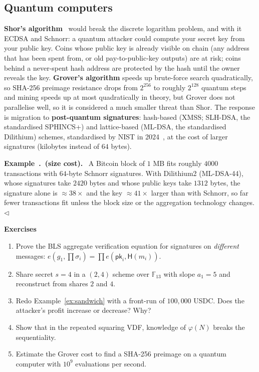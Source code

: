 \documentclass[11pt,a4paper]{article}
\newcounter{exn}[section]
\renewcommand{\theexn}{\thesection.\arabic{exn}}
\newenvironment{plainenglish}{\par\smallskip}{\par\smallskip}
\newenvironment{exbox}[1][]{\par\medskip\refstepcounter{exn}\noindent\textbf{Example~\theexn\if\relax\detokenize{#1}\relax\else\ (#1)\fi.}\ \ignorespaces}{\hfill$\triangleleft$\par\medskip}
\newenvironment{exercisebox}{\par\medskip\noindent\textbf{Exercises}\par\nopagebreak\smallskip}{\par\medskip}
\theoremstyle{definition}
\theoremstyle{plain}
\theoremstyle{remark}
\newcommand{\Hash}{\mathsf{H}}
\newcommand{\F}{\mathbb{F}}
\newcommand{\pk}{\mathsf{pk}}
\begin{document}
\subsection{Quantum computers}

\begin{plainenglish}
\textbf{Shor's algorithm}~\cite{Sho94} would break the discrete logarithm problem, and with it ECDSA and Schnorr: a quantum attacker could compute your secret key from your public key. Coins whose public key is already visible on chain (any address that has been spent from, or old pay-to-public-key outputs) are at risk;
coins behind a never-spent hash address are protected by the hash until the owner reveals the key. \textbf{Grover's algorithm} speeds up brute-force search quadratically, so SHA-256 preimage resistance drops from $2^{256}$ to roughly $2^{128}$ quantum steps and mining speeds up at most quadratically in theory, but Grover does not parallelise well,
so it is considered a much smaller threat than Shor. The response is migration to \textbf{post-quantum signatures}: hash-based (XMSS; SLH-DSA, the standardised SPHINCS+) and lattice-based (ML-DSA, the standardised Dilithium) schemes, standardised by NIST in 2024~\cite{NIST24}, at the cost of larger signatures (kilobytes instead of $64$ bytes).
\end{plainenglish}

\begin{exbox}[size cost]
A Bitcoin block of $1$ MB fits roughly $4000$ transactions with $64$-byte Schnorr signatures. With Dilithium2 (ML-DSA-44), whose signatures take $2420$ bytes and whose public keys take $1312$ bytes, the signature alone is $\approx38\times$ and the key $\approx41\times$ larger than with Schnorr, so far fewer transactions fit unless the block size or the aggregation technology changes.
\end{exbox}

\begin{exercisebox}
\begin{enumerate}[nosep]
\item Prove the BLS aggregate verification equation for signatures on \emph{different} messages: $e(g_1,\prod\sigma_i)=\prod e(\pk_i,\Hash(m_i))$.
\item Share secret $s=4$ in a $(2,4)$ scheme over $\F_{13}$ with slope $a_1=5$ and reconstruct from shares $2$ and $4$.
\item Redo Example~\ref{ex:sandwich} with a front-run of $100{,}000$ USDC. Does the attacker's profit increase or decrease? Why?
\item Show that in the repeated squaring VDF, knowledge of $\varphi(N)$ breaks the sequentiality.
\item Estimate the Grover cost to find a SHA-256 preimage on a quantum computer with $10^9$ evaluations per second.
\end{enumerate}
\end{exercisebox}
\end{document}

